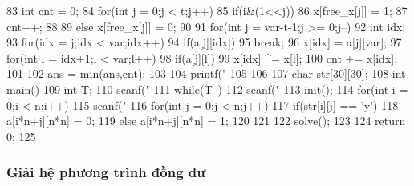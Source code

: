 \documentclass[11pt]{article}
\begin{document}
\begin{Code}
{{{ 83                  int cnt = 0;
 84                  for(int j = 0;j < t;j++){
 85                      if(i&(1<<j)){
 86                          x[free_x[j]] = 1;
 87                          cnt++;
 88                      }
 89                      else x[free_x[j]] = 0;
 90                  }
 91                  for(int j = var-t-1;j >= 0;j--){
 92                      int idx;
 93                      for(idx = j;idx < var;idx++)
 94                          if(a[j][idx])
 95                               break;
 96                      x[idx] = a[j][var];
 97                      for(int l = idx+1;l < var;l++)
 98                          if(a[j][l])
 99                               x[idx] ^= x[l];
100                      cnt += x[idx];
101                  }
102                  ans = min(ans,cnt);
103              }
104              printf("%
105       }
106   }
107   char str[30][30];
108   int main(){
109       int T;
110       scanf("%
111       while(T--){
112           scanf("%
113           init();
114           for(int i = 0;i < n;i++){
115               scanf("%
116               for(int j = 0;j < n;j++){
117                    if(str[i][j] == 'y')
118                        a[i*n+j][n*n] = 0;
119                    else a[i*n+j][n*n] = 1;
120               }
121           }
122           solve();
123       }
124       return 0;
125   }
\end{Code}

\subsubsection{Giải hệ phương trình đồng dư}
\end{document}
